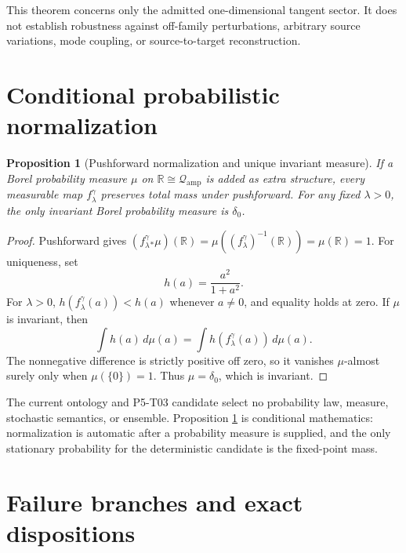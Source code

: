 \documentclass[11pt]{article}
\newcommand{\Qamp}{\mathcal Q_{\mathrm{amp}}}
\newtheorem{proposition}{Proposition}
\begin{document}
This theorem concerns only the admitted one-dimensional tangent sector.
It does not establish robustness against off-family perturbations, arbitrary
source variations, mode coupling, or source-to-target reconstruction.

\section{Conditional probabilistic normalization}

\begin{proposition}[Pushforward normalization and unique invariant measure]
\label{prop:probability}
If a Borel probability measure \(\mu\) on \(\mathbb R\cong\Qamp\) is added
as extra structure, every measurable map \(f^\gamma_\lambda\) preserves total
mass under pushforward.  For any fixed \(\lambda>0\), the only invariant Borel
probability measure is \(\delta_0\).
\end{proposition}

\begin{proof}
Pushforward gives
\((f^\gamma_\lambda{}_\ast\mu)(\mathbb R)
=\mu((f^\gamma_\lambda)^{-1}(\mathbb R))=\mu(\mathbb R)=1\).
For uniqueness, set
\[
 h(a)=\frac{a^2}{1+a^2}.
\]
For \(\lambda>0\),
\(h(f^\gamma_\lambda(a))<h(a)\) whenever \(a\neq0\), and equality holds at
zero.  If \(\mu\) is invariant, then
\[
 \int h(a)\,d\mu(a)
 =\int h(f^\gamma_\lambda(a))\,d\mu(a).
\]
The nonnegative difference is strictly positive off zero, so it vanishes
\(\mu\)-almost surely only when \(\mu(\{0\})=1\).  Thus
\(\mu=\delta_0\), which is invariant.
\end{proof}

The current ontology and P5-T03 candidate select no probability law,
measure, stochastic semantics, or ensemble.  Proposition
\ref{prop:probability} is conditional mathematics: normalization is automatic
after a probability measure is supplied, and the only stationary probability
for the deterministic candidate is the fixed-point mass.

\section{Failure branches and exact dispositions}
\end{document}
